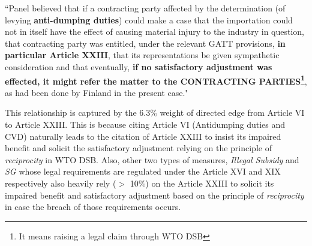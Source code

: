 \begin{displayquote}[]
   ``Panel believed that if a contracting party
   affected by the determination (of levying \textbf{anti-dumping duties}) could make a case that the importation could not in itself have the effect of
   causing material injury to the industry in question, that contracting party was entitled, under the relevant
   GATT provisions, \textbf{in particular Article XXIII}, that its representations be given sympathetic consideration
   and that eventually, \textbf{if no satisfactory adjustment was effected, it might refer the matter to the CONTRACTING
   PARTIES\footnote{It means raising a legal claim through WTO DSB}}, as had been done by Finland in the present case."
\end{displayquote}
 
\noindent This relationship is captured by the $6.3\%$ weight of directed edge from Article VI to Article XXIII. This is because citing Article VI (Antidumping duties and CVD) naturally leads to the citation of Article XXIII to insist its impaired benefit and solicit the satisfactory adjustment relying on the principle of \textit{reciprocity} in WTO DSB.
Also, other two types of measures, \textit{Illegal Subsidy} and \textit{SG} whose legal requirements are regulated under the Article XVI and XIX respectively also heavily rely ($>$ 10\%) on the Article XXIII to solicit its impaired benefit and satisfactory adjustment based on the principle of \textit{reciprocity} in case the breach of those requirements occurs.
 
 

